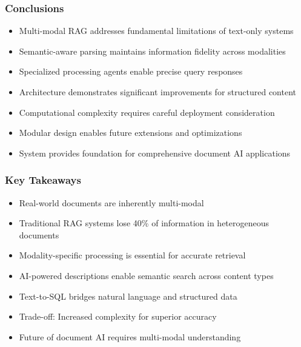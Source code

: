 \begin{frame}[fragile]\frametitle{Conclusions}
\begin{itemize}
\item Multi-modal RAG addresses fundamental limitations of text-only systems
\item Semantic-aware parsing maintains information fidelity across modalities
\item Specialized processing agents enable precise query responses
\item Architecture demonstrates significant improvements for structured content
\item Computational complexity requires careful deployment consideration
\item Modular design enables future extensions and optimizations
\item System provides foundation for comprehensive document AI applications
\end{itemize}
\end{frame}

\begin{frame}[fragile]\frametitle{Key Takeaways}
\begin{itemize}
\item Real-world documents are inherently multi-modal
\item Traditional RAG systems lose 40\% of information in heterogeneous documents
\item Modality-specific processing is essential for accurate retrieval
\item AI-powered descriptions enable semantic search across content types
\item Text-to-SQL bridges natural language and structured data
\item Trade-off: Increased complexity for superior accuracy
\item Future of document AI requires multi-modal understanding
\end{itemize}
\end{frame}